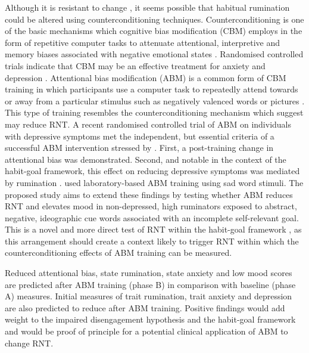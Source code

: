 \documentclass[man,a4paper,biblatex]{apa6}
\begin{document}
Although it is resistant to change \textcite{watkins_habit-goal_2014},
it seems possible that habitual rumination could be altered using
counterconditioning techniques.  Counterconditioning is one of
the basic mechanisms which cognitive bias modification (CBM)
employs in the form of repetitive computer tasks to attenuate
attentional, interpretive and memory biases associated with
negative emotional states \parencite{hertel_cognitive_2011}.  Randomised
controlled trials indicate that CBM may be an effective treatment
for anxiety \parencite{hakamata_attention_2010} and depression
\parencite{yang_attention_2014}.  Attentional bias modification (ABM)
is a common form of CBM training in which participants use a computer
task to repeatedly attend towards or away from a particular stimulus such
as negatively valenced words or pictures \parencite[see][for a recent
review]{macleod_attentional_2015}.  This type of training resembles the
counterconditioning mechanism which \textcite{watkins_habit-goal_2014}
 suggest may reduce RNT.  A recent randomised controlled trial
of ABM on individuals with depressive symptoms
\parencite{yang_attention_2014} met the independent, but
essential criteria of a successful ABM intervention stressed by
\textcite{macleod_attentional_2015}.  First, a post-training
change in attentional bias was demonstrated.  Second,
and notable in the context of the habit-goal framework, this
effect on reducing depressive symptoms was mediated by rumination
\parencite{yang_attention_2014}. \textcite{yang_attention_2014} used
laboratory-based ABM training using sad word stimuli.  The proposed
study aims to extend these findings by testing whether ABM reduces
RNT and elevates mood in non-depressed, high ruminators exposed to
abstract, negative, ideographic cue words associated with an incomplete
self-relevant goal.  This is a novel and more direct test of RNT within
the habit-goal framework \textcite{watkins_habit-goal_2014}, as this
arrangement should create a context likely to trigger RNT within which
the counterconditioning effects of ABM training can be measured.

Reduced attentional bias, state rumination, state anxiety and low mood
scores are predicted after ABM training (phase B) in comparison with
baseline (phase A) measures.  Initial measures of trait rumination, trait
anxiety and depression are also predicted to reduce after ABM training.
Positive findings would add weight to the impaired disengagement
hypothesis \textcite{koster_understanding_2011} and the habit-goal
framework \textcite{watkins_habit-goal_2014} and would be proof of
principle for a potential clinical application of ABM to change RNT.
\end{document}
